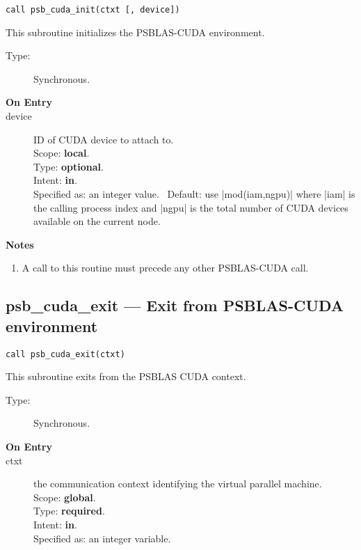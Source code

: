 \begin{verbatim}
call psb_cuda_init(ctxt [, device])
\end{verbatim}

This subroutine initializes the PSBLAS-CUDA  environment. 
\begin{description}
\item[Type:] Synchronous.
\item[\bf  On Entry ]
\item[device] ID of CUDA device to attach to.\\
Scope: {\bf local}.\\
Type: {\bf optional}.\\
Intent: {\bf in}.\\
Specified as: an integer value. \
Default: use \fortinline|mod(iam,ngpu)| where \fortinline|iam| is the calling
process index and \fortinline|ngpu| is the total number of CUDA devices
available on the current node. 
\end{description}


{\par\noindent\large\bfseries Notes}
\begin{enumerate}
\item A call to this routine must precede any other PSBLAS-CUDA call. 
\end{enumerate}

\subsection*{psb\_cuda\_exit --- Exit from  PSBLAS-CUDA
  environment}

\begin{verbatim}
call psb_cuda_exit(ctxt)
\end{verbatim}

This subroutine exits from the  PSBLAS CUDA context.
\begin{description}
\item[Type:] Synchronous.
\item[\bf  On Entry ]
\item[ctxt] the communication context identifying the virtual
  parallel machine.\\
Scope: {\bf global}.\\
Type: {\bf required}.\\
Intent: {\bf in}.\\
Specified as: an integer variable.
\end{description}





